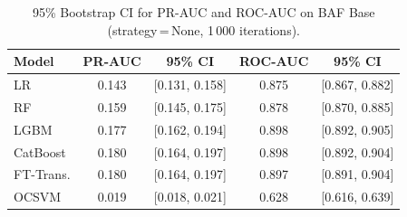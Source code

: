 \begin{table}[H]
\centering
\caption{95\% Bootstrap CI for PR-AUC and ROC-AUC on BAF Base (strategy\,=\,None, 1\,000 iterations).}
\label{tab:ci_baf}
\begin{tabular}{l c c c c}
\toprule
Model & PR-AUC & 95\% CI & ROC-AUC & 95\% CI \\
\midrule
LR         & 0.143 & [0.131, 0.158] & 0.875 & [0.867, 0.882] \\
RF         & 0.159 & [0.145, 0.175] & 0.878 & [0.870, 0.885] \\
LGBM       & 0.177 & [0.162, 0.194] & 0.898 & [0.892, 0.905] \\
CatBoost   & 0.180 & [0.164, 0.197] & 0.898 & [0.892, 0.904] \\
FT-Trans.  & 0.180 & [0.164, 0.197] & 0.897 & [0.891, 0.904] \\
OCSVM      & 0.019 & [0.018, 0.021] & 0.628 & [0.616, 0.639] \\
\bottomrule
\end{tabular}
\end{table}